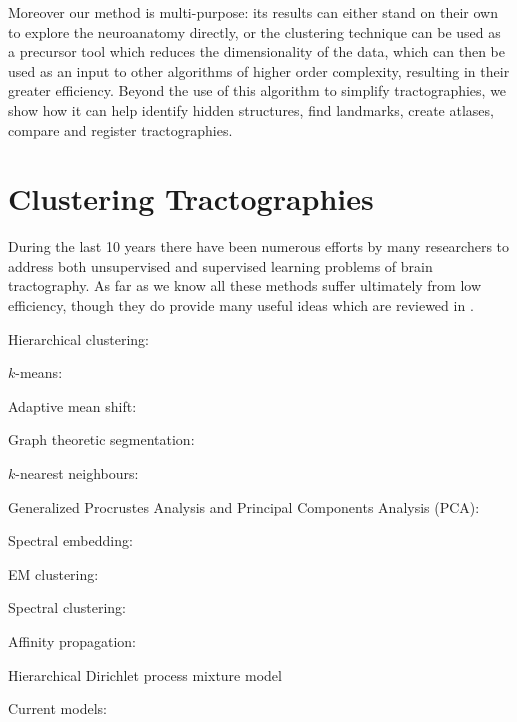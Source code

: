 \documentclass[preprint,authoryear,a4paper,10pt,onecolumn]{elsarticle}
\begin{document}
Moreover our method is multi-purpose: its results can either stand on
their own to explore the neuroanatomy directly, or the clustering
technique can be used as a precursor tool which reduces the
dimensionality of the data, which can then be used as an input to other
algorithms of higher order complexity, resulting in their greater
efficiency. Beyond the use of this algorithm to simplify tractographies,
we show how it can help identify hidden structures, find landmarks,
create atlases, compare and register tractographies.

\section{Clustering Tractographies}

During the last 10 years there have been numerous efforts by many
researchers to address both unsupervised and supervised learning
problems of brain tractography. As far as we know all these methods
suffer ultimately from low efficiency, though they do provide many
useful ideas which are reviewed in \citet{Garyfallidis_thesis}.

\begin{description}

\item[Hierarchical clustering:] \citep{Visser2010, gerig2004analysis,
    Guevara2010, zhang2005dti, jianu2009exploring}

\item[$k$-means:] \citep{ElKouby2005, Tsai2007}

\item[Adaptive mean shift:] \citep{zvitia2008adaptive, Zvitia2010}

\item[Graph theoretic segmentation:] \citep{brun2004clustering}

\item[$k$-nearest neighbours:] \citep{Ding2003a}

\item[Generalized Procrustes Analysis and Principal Components Analysis (PCA):]
\citep{Corouge2004, corouge2004towards, Corouge2006}

\item[Spectral embedding:] \citep{ODonnell_IEEETMI07}

\item[EM clustering:] \citep{Maddah_MICCA2005, maddah2006statistical,
Maddah_IEEEBI2008, ziyan2009consistency} 

\item[Spectral clustering:] \citep{jonasson2005fiber}

\item[Affinity propagation:] \citep{leemans17new, malcolm2009filtered}

\item[Hierarchical Dirichlet process mixture model] \citep{wang2010tractography}

\item[Current models:] \citep{Durrleman2009,Durrleman2009, durrleman2010registration}

\end{description}
\end{document}
